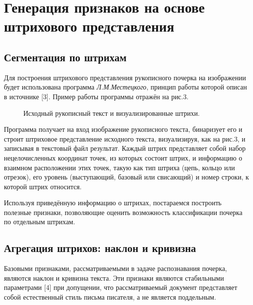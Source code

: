 \documentclass{article}
\begin{document}
\section{Генерация признаков на основе штрихового представления}
\subsection{Сегментация по штрихам}
Для построения штрихового представления рукописного почерка на изображении будет использована программа \emph{Л.М.Местецкого}, принцип работы которой описан в источнике [3].
Пример работы программы отражён на рис.3. 

\begin{figure}[h]
\begin{minipage}[h]{1\linewidth}
\end{minipage}
\vfill
\vspace{0.5cm}
\begin{minipage}[h]{1\linewidth}
\end{minipage}
\caption{Исходный рукописный текст и визуализированные штрихи.}
\end{figure}

Программа получает на вход изображение рукописного текста, бинаризует его и строит штриховое представление исходного текста, визуализируя, как на рис.3, и записывая в текстовый файл результат. Каждый штрих представляет собой набор нецелочисленных координат точек, из которых состоит штрих, и информацию о взаимном расположении этих точек, такую как тип штриха (цепь, кольцо или отрезок), его уровень (выступающий, базовый или свисающий) и номер строки, к которой штрих относится. 

Используя приведённую информацию о штрихах, постараемся построить полезные признаки, позволяющие оценить возможность классификации почерка по отдельным штрихам.

\subsection{Агрегация штрихов: наклон и кривизна}
Базовыми признаками, рассматриваемыми в задаче распознавания почерка, являются наклон и кривизна текста. Эти признаки являются стабильными параметрами [4] при допущении, что рассматриваемый документ представляет собой естественный стиль письма писателя, а не является поддельным. 
\end{document}
